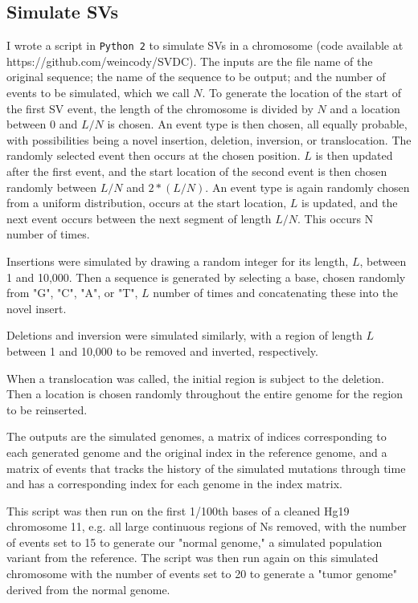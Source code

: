 \documentclass{easychithesis}
\begin{document}
\subsection{Simulate SVs}
I wrote a script in \texttt{Python 2} to simulate SVs in a chromosome (code available at https:\slash \slash github.com\slash weincody\slash SVDC). The inputs are the file name of the original sequence; the name of the sequence to be output; and the number of events to be simulated, which we call $N$. To generate the location of the start of the first SV event, the length of the chromosome is divided by $N$ and a location between 0 and $L/N$ is chosen. An event type is then chosen, all equally probable, with possibilities being a novel insertion, deletion, inversion, or translocation. The randomly selected event then occurs at the chosen position. $L$ is then updated after the first event, and the start location of the second event is then chosen randomly between $L/N$ and $2*(L/N)$. An event type is again randomly chosen from a uniform distribution, occurs at the start location, $L$ is updated, and the next event occurs between the next segment of length $L/N$. This occurs N number of times.

Insertions were simulated by drawing a random integer for its length, $L$, between 1 and 10,000. Then a sequence is generated by selecting a base, chosen randomly from "G", "C", "A", or "T", $L$ number of times and concatenating these into the novel insert. 

Deletions and inversion were simulated similarly, with a region of length $L$ between 1 and 10,000 to be removed and inverted, respectively.

When a translocation was called, the initial region is subject to the deletion. Then a location is chosen randomly throughout the entire genome for the region to be reinserted.

The outputs are the simulated genomes, a matrix of indices corresponding to each generated genome and the original index in the reference genome, and a matrix of events that tracks the history of the simulated mutations through time and has a corresponding index for each genome in the index matrix.

This script was then run on the first 1/100th bases of a cleaned Hg19 chromosome 11, e.g. all large continuous regions of Ns removed, with the number of events set to 15 to generate our "normal genome," a simulated population variant from the reference. The script was then run again on this simulated chromosome with the number of events set to 20 to generate a "tumor genome" derived from the normal genome.
\end{document}
